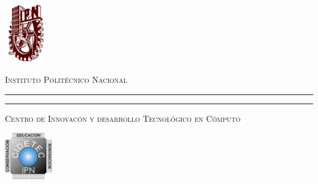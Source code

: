 \documentclass[letter]{letter}
\begin{document}
	
	\thispagestyle{empty}
	
	\begin{minipage}[c][0.1\textheight][c]{0.2\textwidth}
		\begin{center}
			\includegraphics[width=1.9cm, height=2.5cm]{logo_ipn}
		\end{center}
	\end{minipage}
	\begin{minipage}[c][0.1\textheight][t]{0.6\textwidth}
		\begin{center}
			{\scshape {\Large Instituto Polit\'ecnico Nacional}}
			\vspace{.3cm}
			\hrule height2.5pt
			\vspace{.1cm}
			\hrule height1pt
			\vspace{.3cm}
			{\scshape  {\large Centro de Innovac\'on y desarrollo Tecnol\'ogico en C\'omputo} }
		\end{center}
	\end{minipage}
	\begin{minipage}[c][0.1\textheight][c]{0.2\textwidth}
			\begin{center}
				\includegraphics[height=2cm]{logo_cidetec}
			\end{center}
	\end{minipage}
	
	\vspace{1cm}
	
\end{document}
